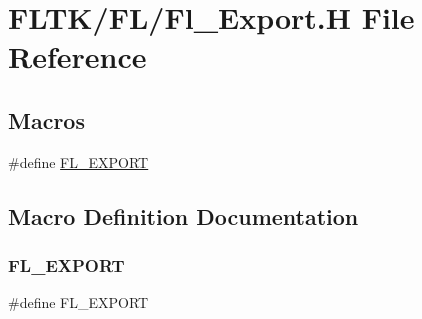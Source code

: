\hypertarget{_fl___export_8_h}{}\section{F\+L\+T\+K/\+F\+L/\+Fl\+\_\+\+Export.H File Reference}
\label{_fl___export_8_h}
\subsection*{Macros}
\begin{DoxyCompactItemize}
\item 
\#define \hyperlink{_fl___export_8_h_aa9ba29a18aee9d738370a06eeb4470fc}{F\+L\+\_\+\+E\+X\+P\+O\+RT}
\end{DoxyCompactItemize}


\subsection{Macro Definition Documentation}
\mbox{\label{_fl___export_8_h_aa9ba29a18aee9d738370a06eeb4470fc}} 
\subsubsection{\texorpdfstring{F\+L\+\_\+\+E\+X\+P\+O\+RT}{FL\_EXPORT}}
{\footnotesize\ttfamily \#define F\+L\+\_\+\+E\+X\+P\+O\+RT}

